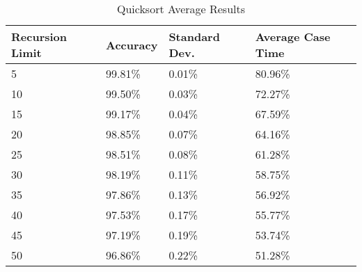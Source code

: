 \begin{table}[]
  \centering
  \caption{Quicksort Average Results}
  \label{quicksortT2}
  \begin{tabular}{|l|l|l|l|}
    \hline
    \textbf{Recursion Limit} & \textbf{Accuracy}  & \textbf{Standard Dev.}  & \textbf{Average Case Time}           \\ \hline
5 &  99.81\% &0.01\% &80.96\%   \\ \hline
10 &  99.50\% &0.03\% &72.27\%   \\ \hline
15 &  99.17\% &0.04\% &67.59\%   \\ \hline
20 &  98.85\% &0.07\% &64.16\%   \\ \hline
25 &  98.51\% &0.08\% &61.28\%   \\ \hline
30 &  98.19\% &0.11\% &58.75\%   \\ \hline
35 &  97.86\% &0.13\% &56.92\%   \\ \hline
40 &  97.53\% &0.17\% &55.77\%   \\ \hline
45 &  97.19\% &0.19\% &53.74\%   \\ \hline
50 &  96.86\% &0.22\% &51.28\%   \\ \hline
  \end{tabular}
\end{table}
